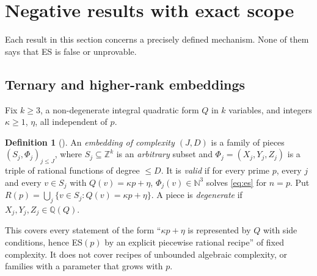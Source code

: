 \documentclass[10pt,reqno]{amsart}
\theoremstyle{definition}
\newtheorem{definition}[theorem]{Definition}
\numberwithin{equation}{section}
\newcommand{\Z}{\mathbb Z}
\newcommand{\N}{\mathbb N}
\newcommand{\Q}{\mathbb Q}
\begin{document}
\section{Negative results with exact scope}\label{sec:negative}
Each result in this section concerns a precisely defined mechanism. None of
them says that ES is false or unprovable.

\subsection{Ternary and higher-rank embeddings}
Fix $k\ge3$, a non-degenerate integral quadratic form $Q$ in $k$ variables,
and integers $\kappa\ge1$, $\eta$, all independent of $p$.

\begin{definition}[{\cite[Def.~1.1]{O124}}]
An \emph{embedding of complexity $(J,D)$} is a family of pieces
$(S_j,\Phi_j)_{j\le J}$, where $S_j\subseteq\Z^k$ is an \emph{arbitrary}
subset and $\Phi_j=(X_j,Y_j,Z_j)$ is a triple of rational functions of
degree $\le D$. It is \emph{valid} if for every prime $p$, every $j$ and
every $v\in S_j$ with $Q(v)=\kappa p+\eta$, $\Phi_j(v)\in\N^3$ solves
\eqref{eq:es} for $n=p$. Put $R(p)=\bigcup_j\{v\in S_j: Q(v)=\kappa p+\eta\}$.
A piece is \emph{degenerate} if $X_j,Y_j,Z_j\in\Q(Q)$.
\end{definition}
This covers every statement of the form ``$\kappa p+\eta$ is represented by
$Q$ with side conditions, hence ES$(p)$ by an explicit piecewise rational
recipe'' of fixed complexity. It does not cover recipes of unbounded
algebraic complexity, or families with a parameter that grows with $p$.
\end{document}
